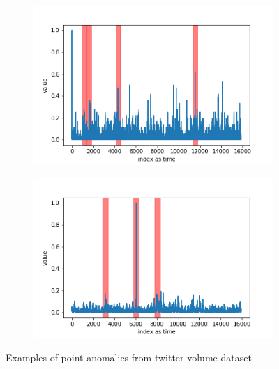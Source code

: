 \documentclass[12pt]{article}
\begin{document}
\begin{figure}[H]
  \begin{subfigure}[t]{.5\textwidth}
    \centering
    \includegraphics[width=\linewidth]{images/dataAnomalies/twitter/Twitter_volume_PFE.png}
  \end{subfigure}
  \hfill
  \begin{subfigure}[t]{.5	\textwidth}
    \centering
    \includegraphics[width=\linewidth]{images/dataAnomalies/twitter/Twitter_volume_CRM.png}
  \end{subfigure}
  \caption{Examples of point anomalies from twitter volume dataset}
  \label{AwsConceptDrift}
\end{figure}
\end{document}
